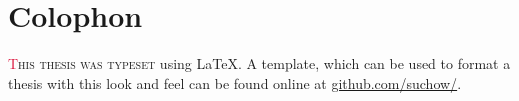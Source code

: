 \chapter*{Colophon}

\begin{center}
\parbox{200pt}{\raggedright\lettrine[lines=3,slope=-2pt,nindent=-4pt]{\textcolor{Crimson}{T}}{his thesis was typeset} using \LaTeX. A template, which can be used to format a thesis with this look and feel can be found online at \href{https://github.com/suchow/}{github.com/suchow/}.
}
\end{center}